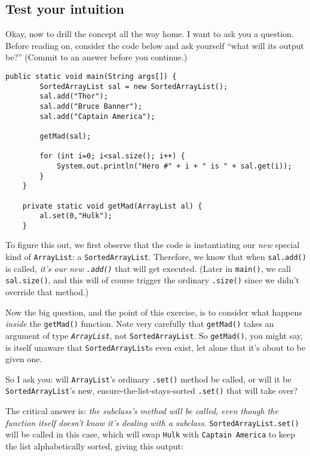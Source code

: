 \subsection{Test your intuition}

\begin{samepage}
Okay, now to drill the concept all the way home. I want to ask you a question.
Before reading on, consider the code below and ask
yourself ``what will its output be?'' (Commit to an answer before you
continue.)

\begin{Verbatim}[fontsize=\small,samepage=true,frame=single]
    public static void main(String args[]) {
        SortedArrayList sal = new SortedArrayList();
        sal.add("Thor");
        sal.add("Bruce Banner");
        sal.add("Captain America");
    
        getMad(sal);
    
        for (int i=0; i<sal.size(); i++) {
            System.out.println("Hero #" + i + " is " + sal.get(i));
        }
    }

    private static void getMad(ArrayList al) {
        al.set(0,"Hulk");
    }
\end{Verbatim}
\end{samepage}

To figure this out, we first observe that the code is instantiating our
\textit{new} special kind of \texttt{ArrayList}: a \texttt{SortedArrayList}.
Therefore, we know that when \texttt{sal.add()} is called, \textit{it's our
new \texttt{.add()}} that will get executed. (Later in \texttt{main()}, we
call \texttt{sal.size()}, and this will of course trigger the ordinary
\texttt{.size()} since we didn't override that method.)

Now the big question, and the point of this exercise, is to consider what
happens \textit{inside} the \texttt{getMad()} function. Note very carefully
that \texttt{getMad()} takes an argument of type \textit{\texttt{ArrayList}},
not \texttt{SortedArrayList}. So \texttt{getMad()}, you might say, is itself
unaware that \texttt{SortedArrayList}s even exist, let alone that it's about
to be given one.

So I ask you: will \texttt{ArrayList}'s ordinary \texttt{.set()} method be
called, or will it be \texttt{SortedArrayList}'s new,
ensure-the-list-stays-sorted \texttt{.set()} that will take over?

The critical answer is: \textit{the subclass's method will be called, even
though the function itself doesn't know it's dealing with a subclass.}
\texttt{SortedArrayList.set()} will be called in this case, which will swap
\texttt{Hulk} with \texttt{Captain America} to keep the list alphabetically
sorted, giving this output:


